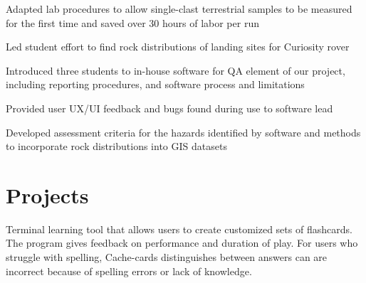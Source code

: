 \documentclass[letterpaper]{deedy-resume} %
\begin{document}
\begin{minipage}[t]{0.66\textwidth}
\sectionspace %



\begin{tightitemize}
\item Adapted lab procedures to allow single-clast terrestrial samples to be measured for the first time and saved over 30 hours of labor per run \\
\end{tightitemize}

\sectionspace %



\begin{tightitemize}
\item Led student effort to find rock distributions of landing sites for Curiosity rover \\
\item Introduced three students to in-house software for QA element of our project, including reporting procedures, and software process and limitations \\
\item Provided user UX/UI feedback and bugs found during use to software lead \\
\item Developed assessment criteria for the hazards identified by software and methods to incorporate rock distributions into GIS datasets \\
\end{tightitemize}

\sectionspace %


\section{Projects}

Terminal learning tool that allows users to create customized sets of flashcards.  The program gives feedback on performance and duration of play.  For users who struggle with spelling, Cache-cards distinguishes between answers can are incorrect because of spelling errors or lack of knowledge. \\
\sectionspace %


\end{minipage}
\end{document}
